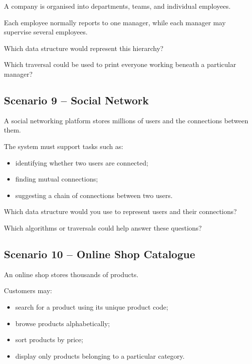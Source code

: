 \documentclass{csc2059practical}
\begin{document}
A company is organised into departments, teams, and individual employees.

Each employee normally reports to one manager, while each manager may supervise several employees.

\begin{reflectionbox}
Which data structure would represent this hierarchy?

Which traversal could be used to print everyone working beneath a particular manager?
\end{reflectionbox}

\subsection*{Scenario 9 -- Social Network}

A social networking platform stores millions of users and the connections between them.

The system must support tasks such as:

\begin{itemize}
    \item identifying whether two users are connected;
    \item finding mutual connections;
    \item suggesting a chain of connections between two users.
\end{itemize}

\begin{reflectionbox}
Which data structure would you use to represent users and their connections?

Which algorithms or traversals could help answer these questions?
\end{reflectionbox}

\subsection*{Scenario 10 -- Online Shop Catalogue}

An online shop stores thousands of products.

Customers may:

\begin{itemize}
    \item search for a product using its unique product code;
    \item browse products alphabetically;
    \item sort products by price;
    \item display only products belonging to a particular category.
\end{itemize}
\end{document}
